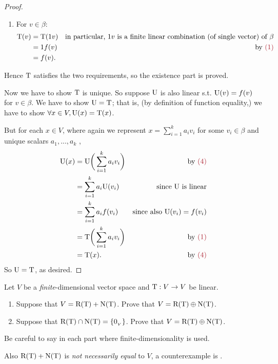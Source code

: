 \begin{proof}
\begin{enumerate}
\item
For \(v \in \beta\):
\begin{align*}
    \T(v) & = \T(1 v) & \text{in particular, \(1v\) is a finite linear combination (of single vector) of \(\beta\)} \\
            & = 1 f(v) & \text{by \MAROON{(1)}} \\
            & = f(v).
\end{align*}
\end{enumerate}
Hence \(\mathrm{T}\) satisfies the two requirements, so the existence part is proved.

Now we have to show \(\mathrm{T}\) is unique.
So suppose \(\mathrm{U}\) is also linear s.t. \(\mathrm{U}(v) = f(v)\) for \(v \in \beta\).
We have to show \(\mathrm{U} = \mathrm{T}\);
that is, (by definition of function equality,) we have to show \(\forall x \in V, \mathrm{U}(x) = \mathrm{T}(x)\).

But for each \(x \in V\), where again we represent \(x = \sum_{i = 1}^k a_i v_i\) for some \(v_i \in \beta\) and unique scalars \(a_1, ..., a_k\) ,
\begin{align*}
    \U(x) & = \U\bigg(\sum_{i = 1}^k a_i v_i\bigg) & \text{by \MAROON{(4)}}\\
           & = \sum_{i = 1}^k a_i \U(v_i) & \text{since \(\U\) is linear} \\
           & = \sum_{i = 1}^k a_i f(v_i) & \text{since also \(\U(v_i) = f(v_i)\)} \\
           & = \T\bigg(\sum_{i = 1}^k a_i v_i\bigg) & \text{by \MAROON{(1)}} \\
           & = \T(x). & \text{by \MAROON{(4)}}
\end{align*}
So \(\mathrm{U} = \mathrm{T}\), as desired.
\end{proof}

\begin{exercise} \label{exercise 2.1.36}
Let \(V\) be a \emph{finite}-dimensional vector space and \(\mathrm{T} : V \to V\) be linear.
\begin{enumerate}
\item Suppose that \(V = \mathrm{R(T)} + \mathrm{N(T)}\).
    Prove that \(V = \mathrm{R(T)} \oplus \mathrm{N(T)}\).
\item Suppose that \(\mathrm{R(T)} \cap \mathrm{N(T)} = \{ 0_{_V} \}\).
    Prove that \(V = \mathrm{R(T)} \oplus \mathrm{N(T)}\).
\end{enumerate}

Be careful to say in each part where finite-dimensionality is used.

Also  \(\mathrm{R(T)} + \mathrm{N(T)}\) is \emph{not necessarily equal} to \(V\), a counterexample is .
\end{exercise}

